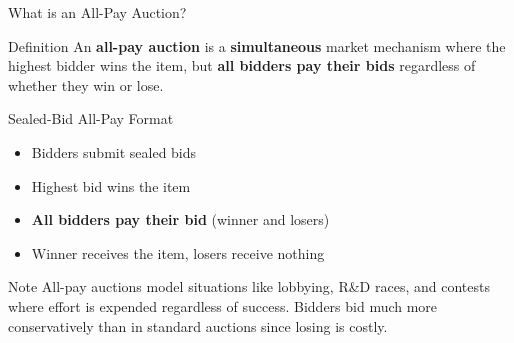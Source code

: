 \documentclass[xcolor={x11names}]{beamer}
\begin{document}
\begin{frame}{What is an All-Pay Auction?}
\begin{block}{Definition}
An \textbf{all-pay auction} is a \textbf{simultaneous} market mechanism where the highest bidder wins the item, but \textbf{all bidders pay their bids} regardless of whether they win or lose.
\end{block}
\begin{exampleblock}{Sealed-Bid All-Pay Format}
\begin{itemize}
\item Bidders submit sealed bids
\item Highest bid wins the item
\item \textbf{All bidders pay their bid} (winner and losers)
\item Winner receives the item, losers receive nothing
\end{itemize}
\end{exampleblock}
\begin{alertblock}{Note}
All-pay auctions model situations like lobbying, R\&D races, and contests where effort is expended regardless of success. Bidders bid much more conservatively than in standard auctions since losing is costly.
\end{alertblock}
\end{frame}
\end{document}
